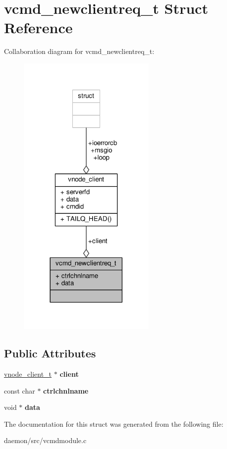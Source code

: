 \hypertarget{structvcmd__newclientreq__t}{\section{vcmd\+\_\+newclientreq\+\_\+t Struct Reference}
\label{structvcmd__newclientreq__t}
}


Collaboration diagram for vcmd\+\_\+newclientreq\+\_\+t\+:
\nopagebreak
\begin{figure}[H]
\begin{center}
\leavevmode
\includegraphics[width=189pt]{structvcmd__newclientreq__t__coll__graph}
\end{center}
\end{figure}
\subsection*{Public Attributes}
\begin{DoxyCompactItemize}
\item 
\hypertarget{structvcmd__newclientreq__t_aa622e547781fe92a7ab2247376c166ac}{\hyperlink{structvnode__client}{vnode\+\_\+client\+\_\+t} $\ast$ {\bfseries client}}\label{structvcmd__newclientreq__t_aa622e547781fe92a7ab2247376c166ac}

\item 
\hypertarget{structvcmd__newclientreq__t_a3dee98ffd9b9f4ba6fcdc221887cd350}{const char $\ast$ {\bfseries ctrlchnlname}}\label{structvcmd__newclientreq__t_a3dee98ffd9b9f4ba6fcdc221887cd350}

\item 
\hypertarget{structvcmd__newclientreq__t_ab2c9958d9ff64faf67edd0ba634dbc44}{void $\ast$ {\bfseries data}}\label{structvcmd__newclientreq__t_ab2c9958d9ff64faf67edd0ba634dbc44}

\end{DoxyCompactItemize}


The documentation for this struct was generated from the following file\+:\begin{DoxyCompactItemize}
\item 
daemon/src/vcmdmodule.\+c\end{DoxyCompactItemize}
